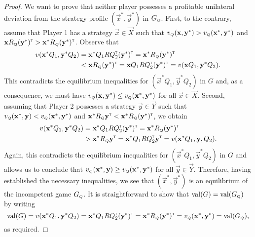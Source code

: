     \begin{proof}
        We want to prove that neither player possesses a profitable unilateral deviation from the strategy profile $(\vec{x}^*, \vec{y}^*)$ in $G_\ms{Q}$.
        First, to the contrary, assume that Player 1 has a strategy $\vec{x} \in \vec{X}$ such that $v_\ms{Q}(\vec{x}, \vec{y}^*) > v_\ms{Q}(\vec{x}^*, \vec{y}^*)$ and $\vec{x} R_\ms{Q} (\vec{y}^*)^\transp > \vec{x}^* R_\ms{Q} (\vec{y}^*)^\transp$.
        Observe that
        \begin{equation}  \label{temp:incompetent-game-equilibrium-1}
        \begin{split}
            v(\vec{x}^* Q_1, \vec{y}^* Q_2)
                & = \vec{x}^* Q_1 R Q_2^\transp (\vec{y}^*)^\transp
                = \vec{x}^* R_\ms{Q} (\vec{y}^*)^\transp \\
                & < \vec{x} R_\ms{Q} (\vec{y}^*)^\transp
                = \vec{x} Q_1 R Q_2^\transp (\vec{y}^*)^\transp
                = v(\vec{x} Q_1, \vec{y}^* Q_2).
        \end{split}
        \end{equation}
        This contradicts the equilibrium inequalities for $(\vec{x}^* Q_1, \vec{y}^* Q_2)$ in $G$ and, as a consequence, we must have $v_\ms{Q}(\vec{x}, \vec{y}^*) \le v_\ms{Q}(\vec{x}^*, \vec{y}^*)$ for all $\vec{x} \in \vec{X}$.
        Second, assuming that Player 2 possesses a strategy $\vec{y} \in \vec{Y}$ such that $v_\ms{Q}(\vec{x}^*, \vec{y}) < v_\ms{Q}(\vec{x}^*, \vec{y}^*)$ and $\vec{x}^* R_\ms{Q}  \vec{y}^\transp < \vec{x}^* R_\ms{Q} (\vec{y}^*)^\transp$, we obtain
        \begin{equation} \label{temp:incompetent-game-equilibrium-2}
        \begin{split}
            v(\vec{x}^* Q_1, \vec{y}^* Q_2)
                & = \vec{x}^* Q_1 R Q_2^\transp (\vec{y}^*)^\transp
                = \vec{x}^* R_\ms{Q} (\vec{y}^*)^\transp \\
                & > \vec{x}^* R_\ms{Q} \vec{y}^\transp
                = \vec{x}^* Q_1 R Q_2^\transp \vec{y}^\transp
                = v(\vec{x}^* Q_1, \vec{y}, Q_2).
        \end{split}
        \end{equation}
        Again, this contradicts the equilibrium inequalities for $(\vec{x}^* Q_1, \vec{y}^* Q_2)$ in $G$ and allows us to conclude that $v_\ms{Q}(\vec{x}^*, \vec{y}) \ge v_\ms{Q}(\vec{x}^*, \vec{y}^*)$ for all $\vec{y} \in \vec{Y}$.
        Therefore, having established the necessary inequalities, we see that $(\vec{x}^*, \vec{y}^*)$ is an equilibrium of the incompetent game $G_\ms{Q}$.
        It is straightforward to show that $\val(G) = \val(G_\ms{Q})$ by writing
        \begin{equation} \label{temp:incompetent-game-equilibrium-3}
            \val(G)
                = v(\vec{x}^* Q_1, \vec{y}^* Q_2)
                = \vec{x}^* Q_1 R Q_2^\transp (\vec{y}^*)^\transp
                = \vec{x}^* R_\ms{Q} (\vec{y}^*)^\transp
                = v_\ms{Q}(\vec{x}^*, \vec{y}^*)
                = \val(G_\ms{Q}),
        \end{equation}
        as required.
    \end{proof}

